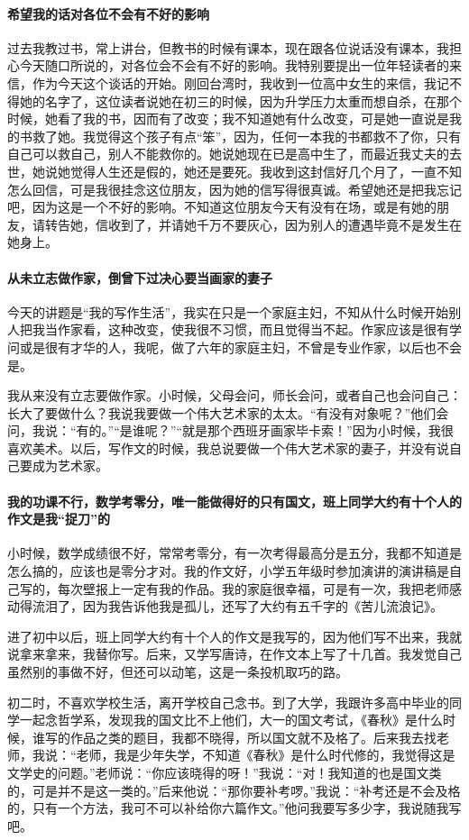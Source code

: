 \paragraph*{希望我的话对各位不会有不好的影响}
\par 过去我教过书，常上讲台，但教书的时候有课本，现在跟各位说话没有课本，我担心今天随口所说的，对各位会不会有不好的影响。我特别要提出一位年轻读者的来信，作为今天这个谈话的开始。刚回台湾时，我收到一位高中女生的来信，我记不得她的名字了，这位读者说她在初三的时候，因为升学压力太重而想自杀，在那个时候，她看了我的书，因而有了改变；我不知道她有什么改变，可是她一直说是我的书救了她。我觉得这个孩子有点“笨”，因为，任何一本我的书都救不了你，只有自己可以救自己，别人不能救你的。她说她现在已是高中生了，而最近我丈夫的去世，她说她觉得人生还是假的，她还是要死。我收到这封信好几个月了，一直不知怎么回信，可是我很挂念这位朋友，因为她的信写得很真诚。希望她还是把我忘记吧，因为这是一个不好的影响。不知道这位朋友今天有没有在场，或是有她的朋友，请转告她，信收到了，并请她千万不要灰心，因为别人的遭遇毕竟不是发生在她身上。


\paragraph*{从未立志做作家，倒曾下过决心要当画家的妻子}
\par 今天的讲题是“我的写作生活”，我实在只是一个家庭主妇，不知从什么时候开始别人把我当作家看，这种改变，使我很不习惯，而且觉得当不起。作家应该是很有学问或是很有才华的人，我呢，做了六年的家庭主妇，不曾是专业作家，以后也不会是。
\par 我从来没有立志要做作家。小时候，父母会问，师长会问，或者自己也会问自己：长大了要做什么？我说我要做一个伟大艺术家的太太。“有没有对象呢？”他们会问，我说：“有的。”“是谁呢？”“就是那个西班牙画家毕卡索！”因为小时候，我很喜欢美术。以后，写作文的时候，我总说要做一个伟大艺术家的妻子，并没有说自己要成为艺术家。

\paragraph*{我的功课不行，数学考零分，唯一能做得好的只有国文，班上同学大约有十个人的作文是我“捉刀”的}
\par 小时候，数学成绩很不好，常常考零分，有一次考得最高分是五分，我都不知道是怎么搞的，应该也是零分才对。我的作文好，小学五年级时参加演讲的演讲稿是自己写的，每次壁报上一定有我的作品。我的家庭很幸福，可是有一次，我把老师感动得流泪了，因为我告诉他我是孤儿，还写了大约有五千字的《苦儿流浪记》。
\par 进了初中以后，班上同学大约有十个人的作文是我写的，因为他们写不出来，我就说拿来拿来，我替你写。后来，又学写唐诗，在作文本上写了十几首。我发觉自己虽然别的事做不好，但还可以动笔，这是一条投机取巧的路。
\par 初二时，不喜欢学校生活，离开学校自己念书。到了大学，我跟许多高中毕业的同学一起念哲学系，发现我的国文比不上他们，大一的国文考试，《春秋》是什么时候，谁写的作品之类的题目，我都不晓得，所以国文就不及格了。后来我去找老师，我说：“老师，我是少年失学，不知道《春秋》是什么时代修的，我觉得这是文学史的问题。”老师说：“你应该晓得的呀！”我说：“对！我知道的也是国文类的，可是并不是这一类的。”后来他说：“那你要补考啰。”我说：“补考还是不会及格的，只有一个方法，我可不可以补给你六篇作文。”他问我要写多少字，我说随我写吧。

